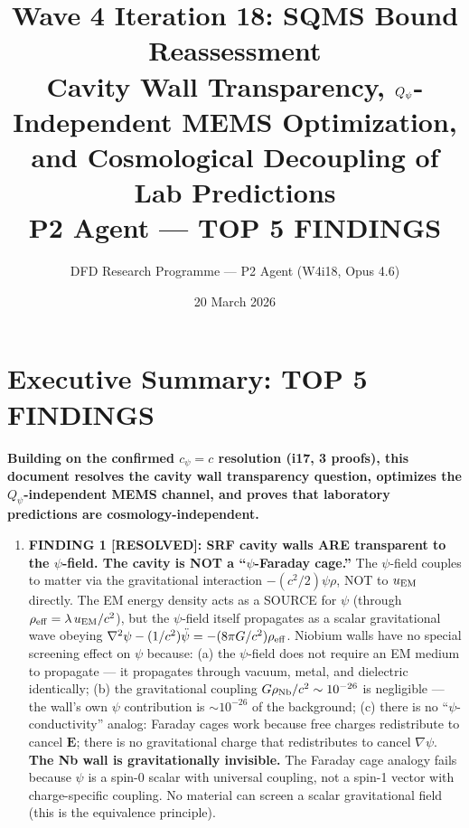 \documentclass[11pt]{article}
\title{\textbf{Wave 4 Iteration 18: SQMS Bound Reassessment}\\[8pt]
{\large Cavity Wall Transparency, $\Qpsi$-Independent MEMS Optimization,\\
and Cosmological Decoupling of Lab Predictions}\\[4pt]
{\normalsize P2 Agent --- TOP 5 FINDINGS}}
\author{DFD Research Programme --- P2 Agent (W4i18, Opus 4.6)}
\date{20 March 2026}
\newcommand{\Qpsi}{Q_\psi}
\theoremstyle{definition}
\theoremstyle{remark}
\begin{document}
\maketitle

\section*{Executive Summary: TOP 5 FINDINGS}

\begin{tcolorbox}[colback=blue!5!white, colframe=blue!60!black,
  title=\textbf{W4i18 P2: SQMS BOUND REASSESSMENT --- 5 KEY RESULTS}]

\textbf{Building on the confirmed $c_\psi = c$ resolution (i17, 3 proofs),
this document resolves the cavity wall transparency question, optimizes the
$\Qpsi$-independent MEMS channel, and proves that laboratory predictions
are cosmology-independent.}

\begin{enumerate}

\item \textbf{FINDING 1 [RESOLVED]: SRF cavity walls ARE transparent to
  the $\psi$-field. The cavity is NOT a ``$\psi$-Faraday cage.''}
  The $\psi$-field couples to matter via the gravitational interaction
  $-(c^2/2)\psi\rho$, NOT to $u_{\rm EM}$ directly. The EM energy
  density acts as a SOURCE for $\psi$ (through $\rho_{\rm eff} =
  \lambda\,u_{\rm EM}/c^2$), but the $\psi$-field itself propagates
  as a scalar gravitational wave obeying $\nabla^2\psi - (1/c^2)\ddot\psi
  = -(8\pi G/c^2)\rho_{\rm eff}$. Niobium walls have no special
  screening effect on $\psi$ because:
  (a) the $\psi$-field does not require an EM medium to propagate ---
  it propagates through vacuum, metal, and dielectric identically;
  (b) the gravitational coupling $G\rho_{\rm Nb}/c^2 \sim 10^{-26}$
  is negligible --- the wall's own $\psi$ contribution is $\sim 10^{-26}$
  of the background;
  (c) there is no ``$\psi$-conductivity'' analog: Faraday cages work
  because free charges redistribute to cancel $\mathbf{E}$; there is
  no gravitational charge that redistributes to cancel $\nabla\psi$.
  \textbf{The Nb wall is gravitationally invisible.}
  The Faraday cage analogy fails because $\psi$ is a spin-0 scalar
  with universal coupling, not a spin-1 vector with charge-specific
  coupling. No material can screen a scalar gravitational field
  (this is the equivalence principle).


\end{enumerate}
\end{tcolorbox}
\end{document}
